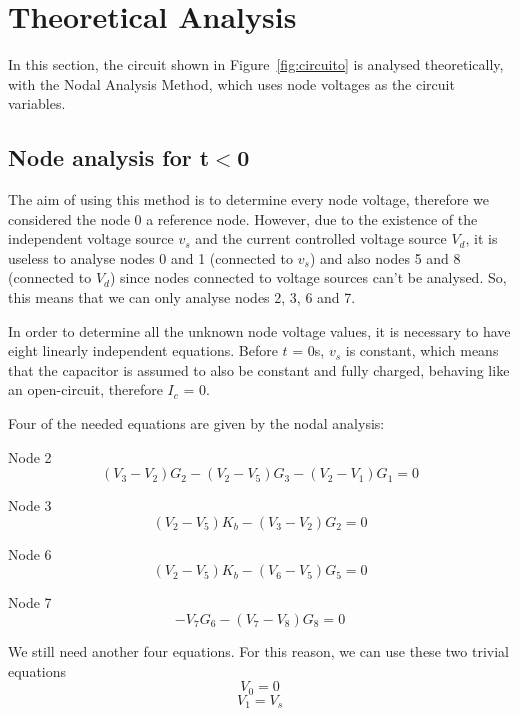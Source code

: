 \section{Theoretical Analysis}
\label{sec:analysis}

\hspace{0,5cm} In this section, the circuit shown in Figure~\ref{fig:circuito} is analysed theoretically, with the Nodal Analysis Method, which uses node voltages as the circuit variables. 


\subsection{Node analysis for t$<$0}

\hspace{0,5cm} The aim of using this method is to determine every node voltage, therefore we considered the node 0 a reference node. However, due to the existence of the independent voltage source $v_s$ and the current controlled voltage source $V_d$, it is useless to analyse nodes 0 and 1 (connected to $v_s$) and also nodes 5 and 8 (connected to $V_d$) since nodes connected to voltage sources can't be analysed. So, this means that we can only analyse nodes 2, 3, 6 and 7.

In order to determine all the unknown node voltage values, it is necessary to have eight linearly independent equations. Before $t$ = 0s, $v_s$ is constant, which means that the capacitor is assumed to also be constant and fully charged, behaving like an open-circuit, therefore $I_c$ = 0.

Four of the needed equations are given by the nodal analysis:
\par
Node 2
\begin{equation}
(V_3-V_2)G_2 - (V_2-V_5)G_3 - (V_2-V_1)G_1 = 0
\label{eq:1.1}
\end{equation}

Node 3
\begin{equation}
(V_2-V_5)K_b - (V_3-V_2)G_2 = 0
\label{eq:1.2}
\end{equation}

Node 6
\begin{equation}
(V_2-V_5)K_b - (V_6-V_5)G_5 = 0
\label{eq:1.3}
\end{equation}

Node 7
\begin{equation}
-V_7 G_6 - (V_7-V_8)G_8 = 0
\label{eq:1.4}
\end{equation}

We still need another four equations. For this reason, we can use these two trivial equations
\begin{equation}
V_0=0
\label{eq:1.5}
\end{equation}
\begin{equation}
V_1=V_s
\label{eq:1.6}
\end{equation}


